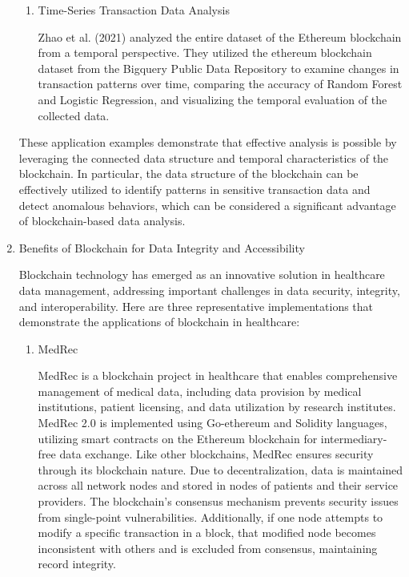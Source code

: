 \documentclass[conference]{IEEEtran}
\begin{document}
\begin{enumerate}[itemsep=2ex, parsep=1ex]
\begin{enumerate}[itemsep=2ex, parsep=1ex]
	      	\item Time-Series Transaction Data Analysis
	      	      	      	      
	      	      Zhao et al. (2021) analyzed the entire dataset of the Ethereum blockchain from a temporal perspective. They utilized the ethereum blockchain dataset from the Bigquery Public Data Repository to examine changes in transaction patterns over time, comparing the accuracy of Random Forest and Logistic Regression, and visualizing the temporal evaluation of the collected data.
	      \end{enumerate}
	      	      
	      These application examples demonstrate that effective analysis is possible by leveraging the connected data structure and temporal characteristics of the blockchain. In particular, the data structure of the blockchain can be effectively utilized to identify patterns in sensitive transaction data and detect anomalous behaviors, which can be considered a significant advantage of blockchain-based data analysis.
	      	      
	\item Benefits of Blockchain for Data Integrity and Accessibility
	      	      
	      Blockchain technology has emerged as an innovative solution in healthcare data management, addressing important challenges in data security, integrity, and interoperability. Here are three representative implementations that demonstrate the applications of blockchain in healthcare:
	      	      
	      \begin{enumerate}[itemsep=2ex, parsep=1ex]
	      	\item MedRec
	      	      	      	      
	      	      MedRec is a blockchain project in healthcare that enables comprehensive management of medical data, including data provision by medical institutions, patient licensing, and data utilization by research institutes. MedRec 2.0 is implemented using Go-ethereum and Solidity languages, utilizing smart contracts on the Ethereum blockchain for intermediary-free data exchange. Like other blockchains, MedRec ensures security through its blockchain nature. Due to decentralization, data is maintained across all network nodes and stored in nodes of patients and their service providers. The blockchain's consensus mechanism prevents security issues from single-point vulnerabilities. Additionally, if one node attempts to modify a specific transaction in a block, that modified node becomes inconsistent with others and is excluded from consensus, maintaining record integrity.
	      	      	      	      

\end{enumerate}
\end{enumerate}
\end{document}
